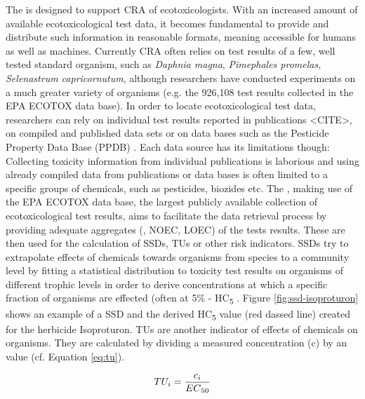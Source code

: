 The \etoxbase{} is designed to support CRA of ecotoxicologists. With an increased amount of available ecotoxicological test data, it becomes fundamental to provide and distribute such information in reasonable formats, meaning accessible for humans as well as machines. Currently CRA often relies on test results of a few, well tested standard organism, such as \textit{Daphnia magna}, \textit{Pimephales promelas}, \textit{Selenastrum capricornutum}, although researchers have conducted experiments on a much greater variety of organisms (e.g. the 926,108 test results collected in the EPA ECOTOX data base). In order to locate ecotoxicological test data, researchers can rely on individual test results reported in publications <CITE>, on compiled and published data sets \citep{malaj_organic_2014} or on data bases such as the Pesticide Property Data Base (PPDB) \citep{lewis_international_2016}. Each data source has its limitations though: Collecting toxicity information from individual publications is laborious and using already compiled data from publications or data bases is often limited to a specific groups of chemicals, such as pesticides, biozides etc. The \etoxbase{}, making use of the EPA ECOTOX data base, the largest publicly available collection of ecotoxicological test results, aims to facilitate the data retrieval process by providing adequate aggregates (\ecfifty{}, NOEC, LOEC) of the tests results. These are then used for the calculation of SSDs, TUs or other risk indicators. SSDs try to extrapolate effects of chemicals towards organisms from species to a community level by fitting a statistical distribution to toxicity test results on organisms of different trophic levels in order to derive concentrations at which a specific fraction of organisms are effected (often at 5\% - HC\textsubscript{5} \citep{posthuma_species_2002}. Figure \ref{fig:ssd-isoproturon} shows an example of a SSD and the derived HC\textsubscript{5} value (red dassed line) created for the herbicide Isoproturon. TUs are another indicator of effects of chemicals on organisms. They are calculated by dividing a measured concentration (c) by an \ecfifty{} value (cf. Equation \ref{eq:tu}).

\begin{equation}
    TU_i = \frac{c_i}{EC\textsubscript{50}}
    \label{eq:tu}
\end{equation}

